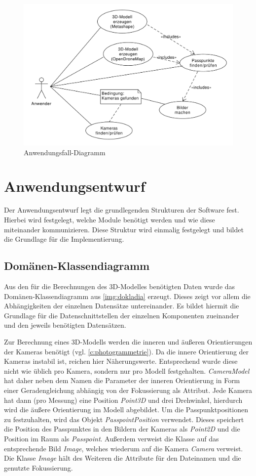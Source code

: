 \documentclass[./00PhotoBox.tex]{subfiles}
\begin{document}
\begin{figure}
  \centering
  \includegraphics[width=1\textwidth]{./img/uml/uml_usecases.pdf}
  \caption{Anwendungsfall-Diagramm} %
  \label{img:anwendungsfall} %
\end{figure}


\section{Anwendungsentwurf}
Der Anwendungsentwurf legt die grundlegenden Strukturen der Software fest. Hierbei wird festgelegt, welche Module benötigt werden und wie diese miteinander kommunizieren. Diese Struktur wird einmalig festgelegt und bildet die Grundlage für die Implementierung.

\subsection{Domänen-Klassendiagramm}
Aus den für die Berechnungen des 3D-Modelles benötigten Daten wurde das Domänen-Klassendiagramm aus \autoref{img:dokladia} erzeugt. Dieses zeigt vor allem die Abhängigkeiten der einzelnen Datensätze untereinander. Es bildet hiermit die Grundlage für die Datenschnittstellen der einzelnen Komponenten zueinander und den jeweils benötigten Datensätzen.

Zur Berechnung eines 3D-Modells werden die inneren und äußeren Orientierungen der Kameras benötigt (vgl. \autoref{c:photogrammetrie}). Da die innere Orientierung der Kameras instabil ist, reichen hier Näherungswerte. Entsprechend wurde diese nicht wie üblich pro Kamera, sondern nur pro Modell festgehalten. \textit{CameraModel} hat daher neben dem Namen die Parameter der inneren Orientierung in Form einer Geradengleichung abhängig von der Fokussierung als Attribut. Jede Kamera hat dann (pro Messung) eine Position  \textit{Point3D} und drei Drehwinkel, hierdurch wird die äußere Orientierung im Modell abgebildet. Um die Passpunktpositionen zu festzuhalten, wird das Objekt \textit{PasspointPosition} verwendet. Dieses speichert die Position des Passpunktes in den Bildern der Kameras als \textit{Point2D} und die Position im Raum als \textit{Passpoint}. Außerdem verweist die Klasse auf das entsprechende Bild \textit{Image}, welches wiederum auf die Kamera \textit{Camera} verweist. Die Klasse \textit{Image} hält des Weiteren die Attribute für den Dateinamen und die genutzte Fokussierung.
\end{document}

